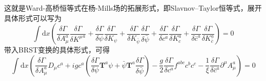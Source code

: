 这就是Ward-高桥恒等式在杨-Mills场的拓展形式，即Slavnov–Taylor恒等式，展开具体形式可以写为
\begin{equation}
    \int\mathrm{d}x \left( \frac{\delta \Gamma}{\delta A_\mu^a}\frac{\delta\Gamma}{\delta {K^\mu}^a} + \frac{\delta\Gamma}{\delta\psi}\frac{\delta\Gamma}{\delta K_\psi} +  \frac{\delta\Gamma}{\delta K_{\bar{\psi}}}\frac{\delta\Gamma}{\delta\bar{\psi}} + \frac{\delta\Gamma}{\delta c^a}\frac{\delta\Gamma}{\delta K^a_c}+ \frac{\delta\Gamma}{\delta \bar{c}^a}\frac{\delta\Gamma}{\delta K^a_{\bar{c}}}\right)=0
\end{equation}
带入BRST变换的具体形式，可得
\begin{equation}
    \int\mathrm{d}x \left( \frac{\delta \Gamma}{\delta A_\mu^a}D_\mu c^a + igc^a(\frac{\delta\Gamma}{\delta\psi}\boldsymbol{T}^a \psi +  \bar{\psi}\boldsymbol{T}^a\frac{\delta\Gamma}{\delta\bar{\psi}}) -\frac{g}{2} \frac{\delta\Gamma}{\delta c^a}f^{abc}c^b c^c -\frac{1}{\xi}\frac{\delta\Gamma}{\delta \bar{c}^a}\partial^\mu A_\mu^a\right)=0
\end{equation}

